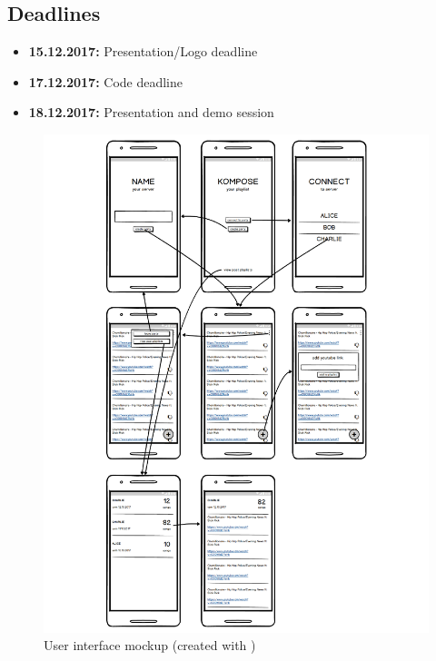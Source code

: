 \documentclass{report}
\begin{document}
\subsection*{Deadlines}
\begin{itemize}
    \item {\bf 15.12.2017:} Presentation/Logo deadline
    \item {\bf 17.12.2017:} Code deadline
    \item {\bf 18.12.2017:} Presentation and demo session
\end{itemize}



\begin{figure}
    \includegraphics[width=\textwidth]{../design/mockups.pdf}
    \caption{User interface mockup (created with \cite{balsamiq})}
\end{figure}
\end{document}
